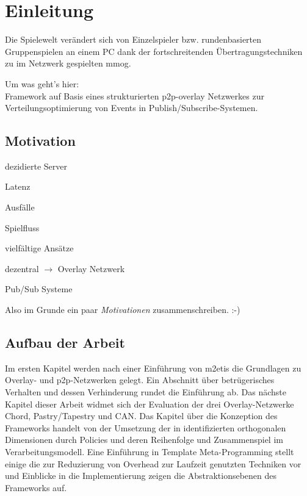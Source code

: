 \chapter{Einleitung}
\label{chap:einleitung}

Die Spielewelt verändert sich von Einzelspieler bzw. rundenbasierten Gruppenspielen an einem PC dank der fortschreitenden Übertragungstechniken zu im Netzwerk gespielten \ac{mmog}.

Um was geht's hier:\\
Framework auf Basis eines strukturierten p2p-overlay Netzwerkes zur Verteilungsoptimierung von Events in Publish/Subscribe-Systemen.

\section{Motivation}
\begin{itemize*}
\item dezidierte Server
\item Latenz
\item Ausfälle
\item Spielfluss
\end{itemize*}

\begin{itemize*}
\item vielfältige Ansätze \cite{Bharambe2008Donnybrook} %
\item dezentral $\rightarrow$ Overlay Netzwerk
\item Pub/Sub Systeme \cite{Knutsson2004Peertopeer, Triebel2008Peertopeer} %
\end{itemize*}

Also im Grunde ein paar \emph{Motivationen} zusammenschreiben. :-)

\cite{Fischer2010Event, Fischer2010a} %

\section{Aufbau der Arbeit}
Im ersten Kapitel werden nach einer Einführung von \ac{m2etis} die Grundlagen zu Overlay- und p2p-Netzwerken gelegt. Ein Abschnitt über betrügerisches Verhalten und dessen Verhinderung rundet die Einführung ab. Das nächste Kapitel dieser Arbeit widmet sich der Evaluation der drei Overlay-Netzwerke Chord, Pastry/Tapestry und CAN. Das Kapitel über die Konzeption des Frameworks handelt von der Umsetzung der in \cite{Fischer2010Event} identifizierten orthogonalen Dimensionen durch Policies und deren Reihenfolge und Zusammenspiel im Verarbeitungsmodell. Eine Einführung in Template Meta-Programming stellt einige die zur Reduzierung von Overhead zur Laufzeit genutzten Techniken vor und Einblicke in die Implementierung zeigen die Abstraktionsebenen des Frameworks auf.
